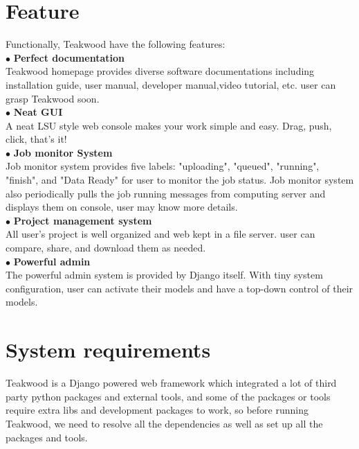 \section{Feature}
Functionally, Teakwood have the following features:\\

$\bullet$ \textbf{Perfect documentation}\\
Teakwood homepage provides diverse software documentations including installation guide, user manual, developer manual,video tutorial, etc. user can grasp Teakwood soon.\\

$\bullet$ \textbf{Neat GUI}\\
A neat LSU style web console makes your work simple and easy. Drag, push, click, that's it!\\

$\bullet$ \textbf{Job monitor System}\\
Job monitor system provides five labels: "uploading", "queued", "running", "finish", and "Data Ready" for user to monitor the job status. Job monitor system also periodically pulls the job running messages from computing server and displays them on console, user may know more details.\\

$\bullet$ \textbf{Project management system}\\
All user's project is well organized and web kept in a file server. user can compare, share, and download them as needed.\\

$\bullet$ \textbf{Powerful admin}\\
The powerful admin system is provided by Django itself. With tiny system configuration, user can activate their models and have a top-down control of their models.\\


\section{System requirements}
Teakwood is a Django powered web framework which integrated a lot of third party python packages and external tools, and some of the packages or tools require extra libs and development packages to work, so before running Teakwood, we need to resolve all the dependencies as well as set up all the packages and tools.

